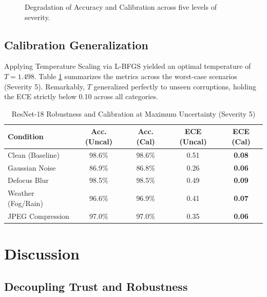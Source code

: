 \documentclass[12pt,a4paper]{report}
\begin{document}
\begin{figure}[h]
    \centering
    \caption{Degradation of Accuracy and Calibration across five levels of severity.}
    \label{fig:trust_decay}
\end{figure}

\section{Calibration Generalization}
\label{sec:calibration_generalization}

Applying Temperature Scaling via L-BFGS yielded an optimal temperature of $T=1.498$. Table \ref{tab:calibration_results} summarizes the metrics across the worst-case scenarios (Severity 5). Remarkably, $T$ generalized perfectly to unseen corruptions, holding the ECE strictly below 0.10 across all categories.

\begin{table}[h]
\centering
\caption{ResNet-18 Robustness and Calibration at Maximum Uncertainty (Severity 5)}
\label{tab:calibration_results}
\begin{tabular}{lcccc}
\toprule
\textbf{Condition} & \textbf{Acc. (Uncal)} & \textbf{Acc. (Cal)} & \textbf{ECE (Uncal)} & \textbf{ECE (Cal)} \\
\midrule
Clean (Baseline)    & 98.6\% & 98.6\% & 0.51 & \textbf{0.08} \\
Gaussian Noise      & 86.9\% & 86.8\% & 0.26 & \textbf{0.06} \\
Defocus Blur        & 98.5\% & 98.5\% & 0.49 & \textbf{0.09} \\
Weather (Fog/Rain)  & 96.6\% & 96.9\% & 0.41 & \textbf{0.07} \\
JPEG Compression    & 97.0\% & 97.0\% & 0.35 & \textbf{0.06} \\
\bottomrule
\end{tabular}
\end{table}

\chapter{Discussion}
\label{ch:discussion}

\section{Decoupling Trust and Robustness}
\label{sec:decoupling}
\end{document}
